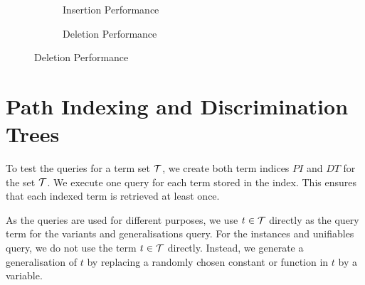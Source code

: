 \begin{figure}[h]
  \begin{subfigure}{0.45\textwidth}
\begin{adjustbox}{width=1\textwidth}
\end{adjustbox}
\caption{Insertion Performance}
\label{pi_insert}
\end{subfigure}
\begin{subfigure}{0.1\textwidth}
\end{subfigure}
\begin{subfigure}{0.45\textwidth}
\begin{adjustbox}{width=1\textwidth}
\end{adjustbox}
\caption{Deletion Performance}
\label{pi_delete}
\end{subfigure}
\end{figure}

\section{Path Indexing and Discrimination Trees} \label{pi_dt}
To test the queries for a term set $\mathcal{T}$, we create both term indices $PI$ and $DT$ for the set $\mathcal{T}$. We execute one query for each term stored in the index. This ensures that each indexed term is retrieved at least once.

As the queries are used for different purposes, we use $t \in \mathcal{T}$ directly as the query term for the variants and generalisations query.
For the instances and unifiables query, we do not use the term $t \in \mathcal{T}$ directly.
Instead, we generate a generalisation of $t$ by replacing a randomly chosen constant or function in $t$ by a variable.

